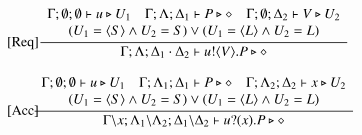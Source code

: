 \begin{figure}[t]
\[\begin{array}{lc}
		\trule{Req}& \hspace{-0.5cm}\tree{
			\begin{array}{c}
				\Gamma; \es; \es \proves u \hastype U_1
				\quad
				\Gamma; \Lambda; \Delta_1 \proves P \hastype \Proc
				\quad
				\Gamma; \es; \Delta_2 \proves V \hastype U_2
				\\
				(U_1 = \chtype{S} 
                                \land %
                                U_2 = S)
				\lor
				 (U_1 = \chtype{L} 
                                \land %
                                 U_2 = L)
			\end{array}
		}{
			\Gamma; \Lambda; \Delta_1 \cat \Delta_2 \proves \bout{u}{V} P \hastype \Proc
		}
		\\[6mm]


		\trule{Acc}&\hspace{-0.5cm} \tree{
			\begin{array}{c}
			\Gamma; \emptyset; \emptyset \proves u \hastype 
U_1 
		\quad
		\Gamma; \Lambda_1; \Delta_1 \proves P \hastype \Proc
		\quad
		\Gamma; \Lambda_2; \Delta_2 \proves x \hastype U_2\\
				(U_1 = \chtype{S} 
                                \land %
                                U_2 = S)
				\lor
				 (U_1 = \chtype{L} 
                                \land %
                                 U_2 = L)
               \end{array}
		}{
			\Gamma\backslash x; \Lambda_1 \backslash \Lambda_2; \Delta_1 \backslash \Delta_2 \proves \binp{u}{x} P \hastype \Proc
		}
		\\[6mm]



\end{array}\]
\end{figure}
